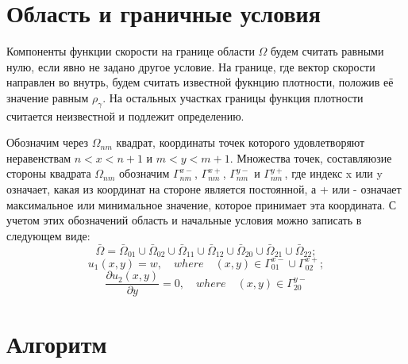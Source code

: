 \section{Область и граничные условия}
Компоненты функции скорости на границе области $\Omega$ будем считать равными нулю, если явно не задано другое условие. На границе, где вектор скорости направлен во внутрь, будем считать известной фукнцию плотности, положив её значение равным $\rho_{\gamma}$. На остальных участках границы функция плотности считается неизвестной и подлежит определению.

Обозначим через $\Omega_{nm}$ квадрат, координаты точек которого удовлетворяют неравенствам $n < x < n + 1$ и $m < y < m + 1$. Множества точек, составляюзие стороны квадрата $\Omega_{nm}$ обозначим $\Gamma^{x-}_{nm}$, $\Gamma^{x+}_{nm}$, $\Gamma^{y-}_{nm}$ и $\Gamma^{y+}_{nm}$, где индекс x или y означает, какая из координат на стороне является постоянной, а + или - означает максимальное или минимальное значение, которое принимает эта координата. С учетом этих обозначений область и начальные условия можно записать в следующем виде:
\begin{equation*}
\bar{\Omega} = \bar{\Omega}_{01}\cup\bar{\Omega}_{02}\cup\bar{\Omega}_{11}\cup\bar{\Omega}_{12}\cup\bar{\Omega}_{20}\cup\bar{\Omega}_{21}\cup\bar{\Omega}_{22};
\end{equation*}
\begin{equation*}
u_1(x, y) = w, \quad where \quad (x, y)\in \Gamma^{x-}_{01}\cup\Gamma^{x+}_{02};
\end{equation*}
\begin{equation*}
\dfrac{\partial u_2 (x, y)}{\partial y} = 0, \quad where \quad (x, y)\in \Gamma^{y-}_{20}
\end{equation*}



\section{\LARGE Алгоритм}

